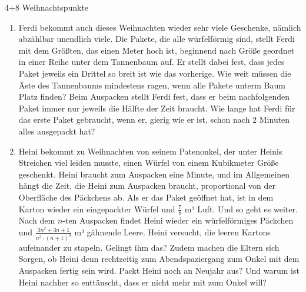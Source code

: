 \documentclass{../problemset}
\begin{document}
\begin{problem}[Weihnachtsaufgaben*]{4+8 Weihnachtspunkte}
\begin{enumerate}
	\item Ferdi bekommt auch dieses Weihnachten wieder sehr viele Geschenke, nämlich abzählbar unendlich viele. Die Pakete, die alle würfelförmig sind, stellt Ferdi mit dem Größten, das einen Meter hoch ist, beginnend nach Größe geordnet in einer Reihe unter dem Tannenbaum auf. Er stellt dabei fest, dass jedes Paket jeweils ein Drittel so breit ist wie das vorherige. Wie weit müssen die Äste des Tannenbaums mindestens ragen, wenn alle Pakete unterm Baum Platz finden? Beim Auspacken stellt Ferdi fest, dass er beim nachfolgenden Paket immer nur jeweils die Hälfte der Zeit braucht. Wie lange hat Ferdi für das erste Paket gebraucht, wenn er, gierig wie er ist, schon nach 2 Minuten alles ausgepackt hat?
	\item Heini bekommt zu Weihnachten von seinem Patenonkel, der unter Heinis Streichen viel leiden musste, einen Würfel von einem Kubikmeter Größe geschenkt. Heini braucht zum Auspacken eine Minute, und im Allgemeinen hängt die Zeit, die Heini zum Auspacken braucht, proportional von der Oberfläche des Päckchens ab. Als er das Paket geöffnet hat, ist in dem Karton wieder ein eingepackter Würfel und $\frac{7}{8}$ m³ Luft. Und so geht es weiter. Nach dem $n$-ten Auspacken findet Heini wieder ein würfelförmiges Päckchen und $\frac{3n^2+3n+1}{n^3\cdot(n+1)^3}$ m³ gähnende Leere. Heini versucht, die leeren Kartons aufeinander zu stapeln. Gelingt ihm das? Zudem machen die Eltern sich Sorgen, ob Heini denn rechtzeitig zum Abendspaziergang zum Onkel mit dem Auspacken fertig sein wird. Packt Heini noch an Neujahr aus? Und warum ist Heini nachher so enttäuscht, dass er nicht mehr mit zum Onkel will?
\end{enumerate}
\end{problem}
\end{document}
